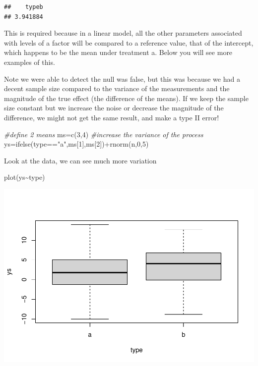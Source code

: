 \documentclass[
]{book}
\newenvironment{Shaded}{\begin{snugshade}}{\end{snugshade}}
\newcommand{\CommentTok}[1]{\textcolor[rgb]{0.56,0.35,0.01}{\textit{#1}}}
\newcommand{\DecValTok}[1]{\textcolor[rgb]{0.00,0.00,0.81}{#1}}
\newcommand{\FunctionTok}[1]{\textcolor[rgb]{0.00,0.00,0.00}{#1}}
\newcommand{\NormalTok}[1]{#1}
\newcommand{\OtherTok}[1]{\textcolor[rgb]{0.56,0.35,0.01}{#1}}
\newcommand{\SpecialCharTok}[1]{\textcolor[rgb]{0.00,0.00,0.00}{#1}}
\newcommand{\StringTok}[1]{\textcolor[rgb]{0.31,0.60,0.02}{#1}}
\begin{document}
\begin{verbatim}
##    typeb 
## 3.941884
\end{verbatim}

This is required because in a linear model, all the other parameters associated with levels of a factor will be compared to a reference value, that of the intercept, which happens to be the mean under treatment a. Below you will see more examples of this.

Note we were able to detect the null was false, but this was because we had a decent sample size compared to the variance of the measurements and the magnitude of the true effect (the difference of the means). If we keep the sample size constant but we increase the noise or decrease the magnitude of the difference, we might not get the same result, and make a type II error!

\begin{Shaded}
\begin{Highlighting}[]
\CommentTok{\#define 2 means}
\NormalTok{ms}\OtherTok{=}\FunctionTok{c}\NormalTok{(}\DecValTok{3}\NormalTok{,}\DecValTok{4}\NormalTok{)}
\CommentTok{\#increase the variance of the process}
\NormalTok{ys}\OtherTok{=}\FunctionTok{ifelse}\NormalTok{(type}\SpecialCharTok{==}\StringTok{"a"}\NormalTok{,ms[}\DecValTok{1}\NormalTok{],ms[}\DecValTok{2}\NormalTok{])}\SpecialCharTok{+}\FunctionTok{rnorm}\NormalTok{(n,}\DecValTok{0}\NormalTok{,}\DecValTok{5}\NormalTok{)}
\end{Highlighting}
\end{Shaded}

Look at the data, we can see much more variation

\begin{Shaded}
\begin{Highlighting}[]
\FunctionTok{plot}\NormalTok{(ys}\SpecialCharTok{\textasciitilde{}}\NormalTok{type)}
\end{Highlighting}
\end{Shaded}

\includegraphics{ECOMODbook_files/figure-latex/a8.12-1.pdf}
\end{document}
